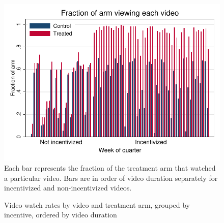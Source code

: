 \documentclass[12pt]{article}
\begin{document}
\clearpage
\begin{figure}[t]
\begin{center}
\caption{Video watch rates by video and treatment arm, grouped by incentive, ordered by video duration}
\label{video_cdf_duration}
\includegraphics[width=1\textwidth, angle=0]{../plots/bar_uviews_duration}
\footnotesize Each bar represents the fraction of the treatment arm that watched a particular video.
Bars are in order of video duration separately for incentivized and non-incentivized videos.
\end{center}
\end{figure}
\end{document}
